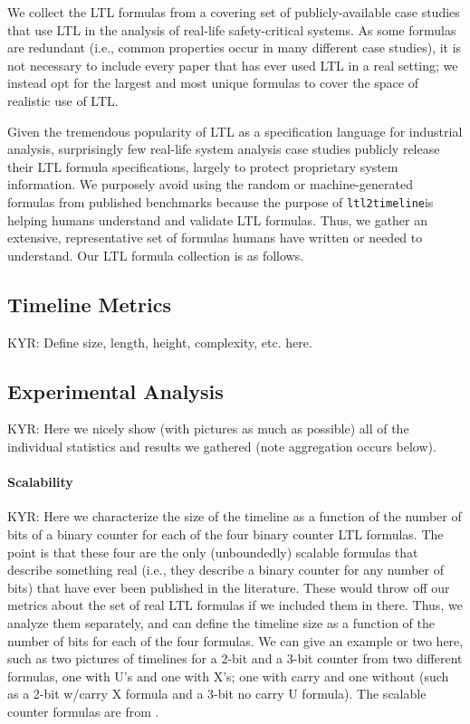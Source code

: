 \documentclass[preprint,12pt]{elsarticle}
\theoremstyle{definition}
\theoremstyle{remark}
\newcommand{\tool}{\texttt{ltl2timeline}}
\begin{document}
We collect the LTL formulas from a covering set of publicly-available case studies that use LTL in the analysis of real-life safety-critical systems. As some formulas are redundant (i.e., common properties occur in many different case studies), it is not necessary to include every paper that has ever used LTL in a real setting; we instead opt for the largest and most unique formulas to cover the space of realistic use of LTL.

Given the tremendous popularity of LTL as a specification language for industrial analysis, surprisingly few real-life system analysis case studies publicly release their LTL formula specifications, largely to protect proprietary system information. We purposely avoid using the random or machine-generated formulas from published benchmarks because the purpose of \tool is helping humans understand and validate LTL formulas. Thus, we gather an extensive, representative set of formulas humans have written or needed to understand. Our LTL formula collection is as follows.





\subsection{Timeline Metrics}
\label{sec:metrics}

KYR: Define size, length, height, complexity, etc. here.

\subsection{Experimental Analysis} %

KYR: Here we nicely show (with pictures as much as possible) all of the individual statistics and results we gathered (note aggregation occurs below).


\paragraph{Scalability}
KYR: Here we characterize the size of the timeline as a function of the number of bits of a binary counter for each of the four binary counter LTL formulas. The point is that these four are the only (unboundedly) scalable formulas that describe something real (i.e., they describe a binary counter for any number of bits) that have ever been published in the literature. These would throw off our metrics about the set of real LTL formulas if we included them in there. Thus, we analyze them separately, and can define the timeline size as a function of the number of bits for each of the four formulas. We can give an example or two here, such as two pictures of timelines for a 2-bit and a 3-bit counter from two different formulas, one with U's and one with X's; one with carry and one without (such as a 2-bit w/carry X formula and a 3-bit no carry U formula). The scalable counter formulas are from \cite{RV10}.
\end{document}
